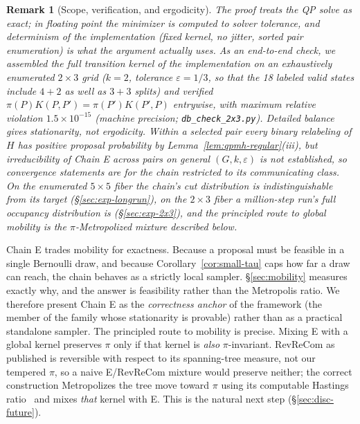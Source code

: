 \documentclass[11pt]{article}
\newtheorem{remark}{Remark}[section]
\begin{document}
\begin{remark}[Scope, verification, and ergodicity]\label{rem:qpmh-scope}
The proof treats the QP solve as exact; in floating point the
minimizer is computed to solver tolerance, and determinism of the
implementation (fixed kernel, no jitter, sorted pair enumeration) is
what the argument actually uses. As an end-to-end check, we assembled
the full transition kernel of the implementation on an exhaustively
enumerated $2 \times 3$ grid ($k = 2$, tolerance $\varepsilon = 1/3$,
so that the 18 labeled valid states include $4{+}2$ as well as
$3{+}3$ splits) and verified
$\pi(P)K(P,P') = \pi(P')K(P',P)$ entrywise, with maximum relative
violation $1.5 \times 10^{-15}$ (machine precision;
\texttt{db\_check\_2x3.py}). Detailed balance
gives stationarity, not ergodicity. Within a selected pair every
binary relabeling of $H$ has positive proposal probability by
Lemma~\ref{lem:qpmh-regular}(iii), but irreducibility of Chain E
across pairs on general $(G, k, \varepsilon)$ is not established, so
convergence statements are for the chain restricted to its
communicating class. On the enumerated $5 \times 5$ fiber the chain's cut distribution is
indistinguishable from its target (\S\ref{sec:exp-longrun}), on the
$2 \times 3$ fiber a million-step run's full occupancy distribution
is (\S\ref{sec:exp-2x3}), and the principled route to global mobility
is the $\pi$-Metropolized mixture described below.
\end{remark}

Chain E trades mobility for exactness. Because a proposal must be
feasible in a single Bernoulli draw, and because
Corollary~\ref{cor:small-tau} caps how far a draw can reach, the
chain behaves as a strictly local sampler. \S\ref{sec:mobility}
measures exactly why, and the answer is feasibility rather than the
Metropolis ratio. We therefore present Chain E as the
\emph{correctness anchor} of the framework (the member of the family
whose stationarity is provable) rather than as a practical standalone
sampler. The principled route to mobility is precise. Mixing E with a
global kernel preserves $\pi$ only if that kernel is \emph{also}
$\pi$-invariant. RevReCom as published is reversible with respect to
its spanning-tree measure, not our tempered $\pi$, so a naive
E/RevReCom mixture would preserve neither; the correct construction
Metropolizes the tree move toward $\pi$ using its computable Hastings
ratio~\cite{cannon2022spanning,autry2023metropolized} and mixes
\emph{that} kernel with E. This is the natural next step
(\S\ref{sec:disc-future}).
\end{document}
